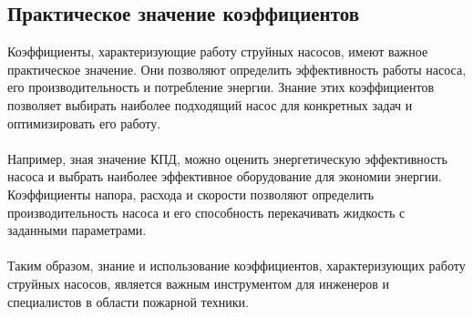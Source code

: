 \documentclass{article}
\begin{document}
\subsection{Практическое значение коэффициентов}
Коэффициенты, характеризующие работу струйных насосов, имеют важное практическое значение. Они позволяют определить эффективность работы насоса, его производительность и потребление энергии. Знание этих коэффициентов позволяет выбирать наиболее подходящий насос для конкретных задач и оптимизировать его работу.\\
~\\
Например, зная значение КПД, можно оценить энергетическую эффективность насоса и выбрать наиболее эффективное оборудование для экономии энергии. Коэффициенты напора, расхода и скорости позволяют определить производительность насоса и его способность перекачивать жидкость с заданными параметрами.\\
~\\
Таким образом, знание и использование коэффициентов, характеризующих работу струйных насосов, является важным инструментом для инженеров и специалистов в области пожарной техники.
\end{document}
